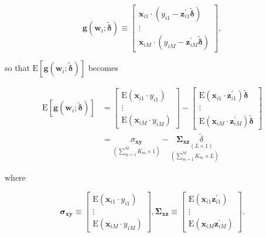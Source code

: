 \documentclass[10pt]{article}
\begin{document}
\[
\mathbf{g}\left(\mathbf{w}_{i} ; \tilde{\boldsymbol{\delta}}\right) \equiv\left[\begin{array}{c}
\mathbf{x}_{i 1} \cdot\left(y_{i 1}-\mathbf{z}_{i 1}^{\prime} \tilde{\boldsymbol{\delta}}\right)  \tag{4.6.2}\\
\vdots \\
\mathbf{x}_{i M} \cdot\left(y_{i M}-\mathbf{z}_{i M}^{\prime} \tilde{\boldsymbol{\delta}}\right)
\end{array}\right],
\]

so that $\mathrm{E}\left[\mathbf{g}\left(\mathbf{w}_{i} ; \tilde{\boldsymbol{\delta}}\right)\right]$ becomes


\begin{align*}
\mathrm{E}\left[\mathbf{g}\left(\mathbf{w}_{i} ; \tilde{\boldsymbol{\delta}}\right)\right] & =\left[\begin{array}{c}
\mathrm{E}\left(\mathbf{x}_{i 1} \cdot y_{i 1}\right) \\
\vdots \\
\mathrm{E}\left(\mathbf{x}_{i M} \cdot y_{i M}\right)
\end{array}\right]-\left[\begin{array}{c}
\mathrm{E}\left(\mathbf{x}_{i 1} \cdot \mathbf{z}_{i 1}^{\prime}\right) \tilde{\boldsymbol{\delta}} \\
\vdots \\
\mathrm{E}\left(\mathbf{x}_{i M} \cdot \mathbf{z}_{i M}^{\prime}\right) \tilde{\boldsymbol{\delta}}
\end{array}\right] \\
& =\underset{\left(\sum_{m=1}^{M} K_{m} \times 1\right)}{\sigma_{\mathbf{x y}}}-\underset{\left(\sum_{m=1}^{M} K_{m} \times L\right)}{\boldsymbol{\Sigma}_{\mathbf{x z}} \underset{(L \times 1)}{\tilde{\delta}}} \tag{4.6.3}
\end{align*}


where

\[
\boldsymbol{\sigma}_{\mathbf{x y}} \equiv\left[\begin{array}{c}
\mathrm{E}\left(\mathbf{x}_{i 1} \cdot y_{i 1}\right)  \tag{4.6.4}\\
\vdots \\
\mathrm{E}\left(\mathbf{x}_{i M} \cdot y_{i M}\right)
\end{array}\right], \boldsymbol{\Sigma}_{\mathbf{x z}} \equiv\left[\begin{array}{c}
\mathrm{E}\left(\mathbf{x}_{i 1} \mathbf{z}_{i 1}^{\prime}\right) \\
\vdots \\
\mathrm{E}\left(\mathbf{x}_{i M} \mathbf{z}_{i M}^{\prime}\right)
\end{array}\right] .
\]
\end{document}
